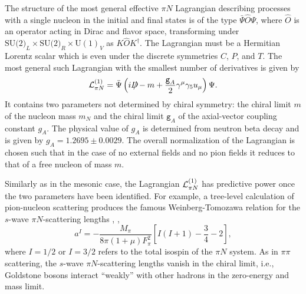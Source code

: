 \documentclass[twoside,12pt]{article}
\begin{document}
   The structure of the most general effective $\pi N$ Lagrangian describing
processes with a single nucleon in the initial and final states is of the type
$\bar{\Psi} \widehat{O} \Psi$, where $\widehat{O}$ is an operator acting
in Dirac and flavor space, transforming under
$\mbox{SU(2)}_L\times\mbox{SU(2)}_R\times \mbox{U}(1)_V$
as $K\widehat{O}K^\dagger$.
   The Lagrangian must be a Hermitian Lorentz scalar
which is even under the discrete symmetries $C$, $P$, and $T$.
   The most general such Lagrangian with the smallest number of derivatives
is given by \cite{Gasser:1987rb}
\begin{equation}
\label{4:1:2:l1pin}
{\cal L}^{(1)}_{\pi N}=\bar{\Psi}\left(iD\hspace{-.6em}/ -m
+\frac{\texttt{g}_A}{2}\gamma^\mu \gamma_5 u_\mu\right)\Psi.
\end{equation}
   It contains two parameters not determined by chiral symmetry:
the chiral limit $m$ of the nucleon mass $m_N$
and the chiral limit $\texttt{g}_A$ of the axial-vector coupling constant
$g_A$.
   The physical value of $g_A$ is determined from neutron beta decay and is
given by $g_A=1.2695\pm 0.0029$.
   The overall normalization of the Lagrangian is chosen such that in the
case of no external fields and no pion fields it reduces to that
of a free nucleon of mass $m$.

   Similarly as in the mesonic case, the Lagrangian ${\cal L}^{(1)}_{\pi N}$
has predictive power once the two parameters have been identified.
   For example, a tree-level calculation of pion-nucleon scattering produces
the famous Weinberg-Tomozawa relation for the $s$-wave $\pi N$-scattering
lengths \cite{Weinberg:1966kf}, \cite{Tomozawa:1966jm},
\begin{equation}
\label{5:3:weinbergtomozawa}
a^I=-\frac{M_\pi}{8\pi (1+\mu)F_\pi^2}\left[I(I+1)-\frac{3}{4}-2\right],
\end{equation}
where $I=1/2$ or $I=3/2$ refers to the total isospin of the $\pi N$ system.
   As in $\pi\pi$ scattering, the $s$-wave $\pi N$-scattering lengths vanish
in the chiral limit, i.e., Goldstone bosons interact ``weakly'' with other
hadrons in the zero-energy and mass limit.
\end{document}
